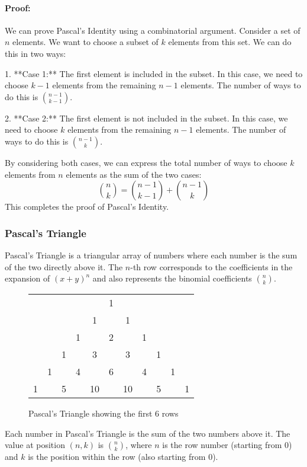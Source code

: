 \paragraph{Proof:}
We can prove Pascal's Identity using a combinatorial argument. Consider a set of \(n\) elements. We want to choose a subset of \(k\) elements from this set. We can do this in two ways:

1. **Case 1:** The first element is included in the subset. In this case, we need to choose \(k-1\) elements from the remaining \(n-1\) elements. The number of ways to do this is \(\binom{n-1}{k-1}\).

2. **Case 2:** The first element is not included in the subset. In this case, we need to choose \(k\) elements from the remaining \(n-1\) elements. The number of ways to do this is \(\binom{n-1}{k}\).

By considering both cases, we can express the total number of ways to choose \(k\) elements from \(n\) elements as the sum of the two cases:
\[
\binom{n}{k} = \binom{n-1}{k-1} + \binom{n-1}{k}
\]
This completes the proof of Pascal's Identity.

\subsubsection{Pascal's Triangle}
Pascal's Triangle is a triangular array of numbers where each number is the sum of the two directly above it. The \(n\)-th row corresponds to the coefficients in the expansion of \((x + y)^n\) and also represents the binomial coefficients \(\binom{n}{k}\).

\begin{figure}[h]
    \centering
    \begin{tabular}{ccccccccccc}
        & & & & & 1 & & & & & \\
        & & & & 1 & & 1 & & & & \\
        & & & 1 & & 2 & & 1 & & & \\
        & & 1 & & 3 & & 3 & & 1 & & \\
        & 1 & & 4 & & 6 & & 4 & & 1 & \\
        1 & & 5 & & 10 & & 10 & & 5 & & 1 \\
    \end{tabular}
    \caption{Pascal's Triangle showing the first 6 rows}
    \label{fig:pascal}
\end{figure}

\noindent
Each number in Pascal's Triangle is the sum of the two numbers above it. The value at position $(n,k)$ is $\binom{n}{k}$, where $n$ is the row number (starting from 0) and $k$ is the position within the row (also starting from 0).
\

